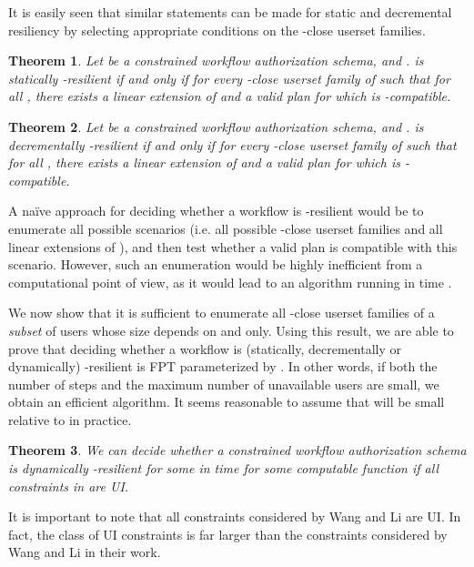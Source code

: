\documentclass[jcs,crcready]{iosart1c}
\newtheorem{thm}{Theorem}
\begin{document}
It is easily seen that similar statements can be made for static and decremental resiliency by selecting appropriate conditions on the -close userset families.
 \begin{thm}
 Let  be a constrained workflow authorization schema, and .  is statically -resilient if and only if for every -close userset family  of  such that  for all , there exists a linear extension  of  and a valid plan for  which is -compatible. 
 \end{thm}
 
  \begin{thm}
 Let  be a constrained workflow authorization schema, and .  is decrementally -resilient if and only if for every -close userset family  of  such that  for all , there exists a linear extension  of  and a valid plan for  which is -compatible.
 \end{thm}
 

A na\"ive approach for deciding whether a workflow is -resilient would be to enumerate all possible scenarios (i.e. all possible -close userset families and all linear extensions of ), and then test whether a valid plan is compatible with this scenario. However, such an enumeration would be highly inefficient from a computational point of view, as it would lead to an algorithm running in time .

We now show that it is sufficient to enumerate all -close userset families of a {\em subset} of users whose size depends on  and  only. 
Using this result, we are able to prove that deciding whether a workflow is (statically, decrementally or dynamically) -resilient is FPT parameterized by . In other words, if both the number of steps and the maximum number of unavailable users are small, we obtain an efficient algorithm.
It seems reasonable to assume that  will be small relative to  in practice. 

\begin{thm}\label{thm:fptresiliency}
We can decide whether a constrained workflow authorization schema \mbox{} is dynamically -resilient for some  in time  for some computable function  if all constraints in  are UI.
\end{thm}

It is important to note that all constraints considered by Wang and Li are UI.
In fact, the class of UI constraints is far larger than the constraints considered by Wang and Li in their work.
\end{document}
